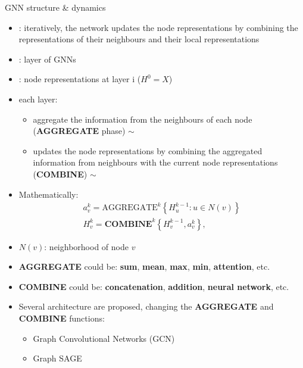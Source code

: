 \documentclass[presentation, 9pt]{beamer}\mode<presentation>{\usetheme{AMSBolognaFC}}
\begin{document}
\begin{frame}{GNN structure \& dynamics}
	\begin{itemize}
		\item {}: iteratively, the network updates the node representations 
		by combining the representations of their neighbours and their local representations
		\item {}: layer of GNNs
		\item {}: node representations at layer i ($H^0 = X$)
		\item each layer:
		\begin{itemize}
			\item aggregate the information from the neighbours of each node (\textbf{AGGREGATE} phase) $\sim$ 
			\item updates the node representations by combining the aggregated information from neighbours with the current node representations (\textbf{COMBINE}) $\sim$ 
		\end{itemize}
		\item Mathematically:
			$$
			\begin{array}{l}
			a_v^k=\text{AGGREGATE}^k\left\{H_u^{k-1}: u \in N(v)\right\} \\
			H_v^k=\mathbf{COMBINE}^k\left\{H_v^{k-1}, a_v^k\right\},
			\end{array}
			$$
		\item $N(v)$: neighborhood of node $v$
		\item \textbf{AGGREGATE} could be: \textbf{sum}, \textbf{mean}, \textbf{max}, \textbf{min}, \textbf{attention}, etc.
		\item \textbf{COMBINE} could be: \textbf{concatenation}, \textbf{addition}, \textbf{neural network}, etc.
		\item Several architecture are proposed, changing the \textbf{AGGREGATE} and \textbf{COMBINE} functions:
		\begin{itemize}
			\item Graph Convolutional Networks (GCN)~
			\item Graph SAGE~
		\end{itemize}
	\end{itemize}
\end{frame}
\end{document}
